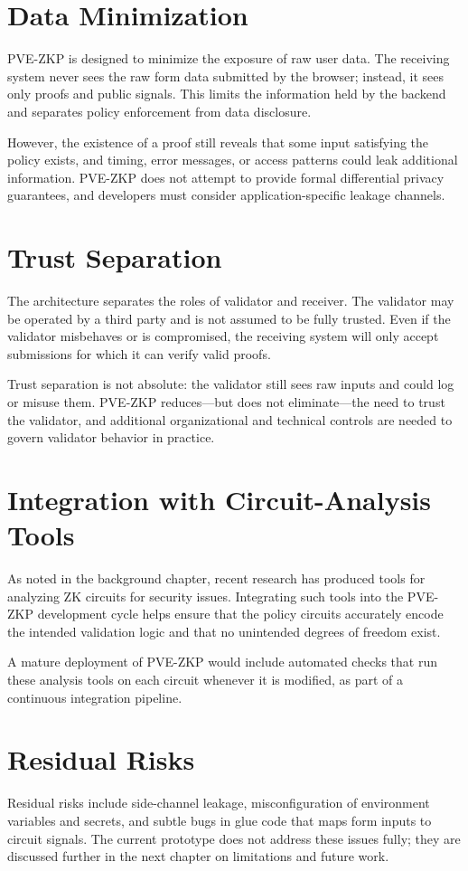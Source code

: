 \section{Data Minimization}

PVE-ZKP is designed to minimize the exposure of raw user data. The receiving
system never sees the raw form data submitted by the browser; instead, it sees
only proofs and public signals. This limits the information held by the
backend and separates policy enforcement from data disclosure.

However, the existence of a proof still reveals that some input satisfying the
policy exists, and timing, error messages, or access patterns could leak
additional information. PVE-ZKP does not attempt to provide formal differential
privacy guarantees, and developers must consider application-specific leakage
channels.

\section{Trust Separation}

The architecture separates the roles of validator and receiver. The validator
may be operated by a third party and is not assumed to be fully trusted. Even
if the validator misbehaves or is compromised, the receiving system will only
accept submissions for which it can verify valid proofs.

Trust separation is not absolute: the validator still sees raw inputs and could
log or misuse them. PVE-ZKP reduces---but does not eliminate---the need to
trust the validator, and additional organizational and technical controls are
needed to govern validator behavior in practice.

\section{Integration with Circuit-Analysis Tools}

As noted in the background chapter, recent research has produced tools for
analyzing ZK circuits for security issues. Integrating such tools into the
PVE-ZKP development cycle helps ensure that the policy circuits accurately
encode the intended validation logic and that no unintended degrees of freedom
exist.

A mature deployment of PVE-ZKP would include automated checks that run these
analysis tools on each circuit whenever it is modified, as part of a continuous
integration pipeline.

\section{Residual Risks}

Residual risks include side-channel leakage, misconfiguration of environment
variables and secrets, and subtle bugs in glue code that maps form inputs to
circuit signals. The current prototype does not address these issues fully; they
are discussed further in the next chapter on limitations and future work.
